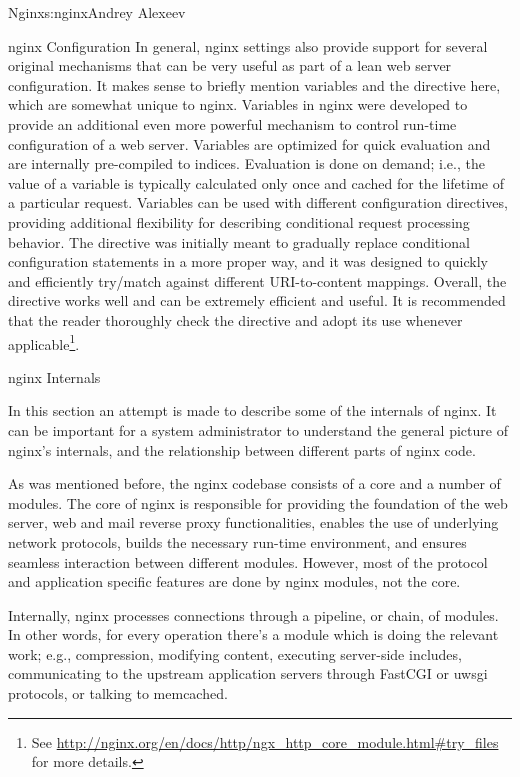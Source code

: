\begin{aosachapter}{Nginx}{s:nginx}{Andrey Alexeev}
\begin{aosasect1}{nginx Configuration}
In general, nginx settings also provide support for several original
mechanisms that can be very useful as part of a lean web server
configuration. It makes sense to briefly mention variables and the
 directive here, which are somewhat unique to
nginx. Variables in nginx were developed to provide an additional even
more powerful mechanism to control run-time configuration of a web
server. Variables are optimized for quick evaluation and are
internally pre-compiled to indices. Evaluation is done on demand;
i.e., the value of a variable is typically calculated only once and
cached for the lifetime of a particular request. Variables can be used
with different configuration directives, providing additional
flexibility for describing conditional request processing
behavior. The  directive was initially meant to
gradually replace conditional  configuration statements in a
more proper way, and it was designed to quickly and efficiently
try/match against different URI-to-content mappings. Overall, the
 directive works well and can be extremely efficient
and useful. It is recommended that the reader thoroughly check the
 directive and adopt its use whenever
applicable\footnote{See
  \url{http://nginx.org/en/docs/http/ngx\_http\_core\_module.html#try\_files}
  for more details.}.

\end{aosasect1}

\begin{aosasect1}{nginx Internals} \label{sec.nginx.internals}

In this section an attempt is made to describe some of the internals
of nginx. It can be important for a system administrator to understand
the general picture of nginx's internals, and the relationship between
different parts of nginx code.

As was mentioned before, the nginx codebase consists of a core and a
number of modules. The core of nginx is responsible for providing the
foundation of the web server, web and mail reverse proxy
functionalities, enables the use of underlying network protocols,
builds the necessary run-time environment, and ensures seamless
interaction between different modules. However, most of the protocol
and application specific features are done by nginx modules, not the
core.

Internally, nginx processes connections through a pipeline, or chain,
of modules. In other words, for every operation there's a module which
is doing the relevant work; e.g., compression, modifying content,
executing server-side includes, communicating to the upstream
application servers through FastCGI or uwsgi protocols, or talking to
memcached.


\end{aosasect1}
\end{aosachapter}

